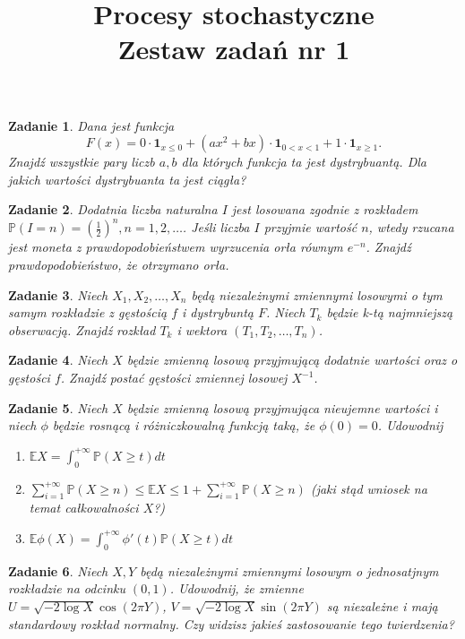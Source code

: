 \documentclass{mwart}
\title{Procesy stochastyczne\\ Zestaw zadań nr 1}
\newtheorem{zd}{Zadanie}
\begin{document}

\maketitle
\begin{zd}
Dana jest funkcja
\begin{displaymath}
F(x) = 0\cdot\pmb{1}_{x\leq 0} + (ax^2+bx)\cdot\pmb{1}_{0<x< 1} + 1\cdot \pmb{1}_{x\geq 1}.
\end{displaymath}
Znajdź wszystkie pary liczb $a, b$ dla których funkcja ta jest dystrybuantą. Dla jakich wartości dystrybuanta ta jest ciągła?
\end{zd}

\begin{zd}
Dodatnia liczba naturalna $I$ jest losowana zgodnie z rozkładem $\mathbb{P}(I =n) = \left(\frac{1}{2}\right)^n, n = 1,2, \dots$. Jeśli liczba $I$ przyjmie wartość $n$, wtedy rzucana jest moneta z prawdopodobieństwem wyrzucenia orła równym $e^{-n}$. Znajdź prawdopodobieństwo, że otrzymano orła.
\end{zd}

\begin{zd}
Niech $X_1, X_2, \dots, X_n$ będą niezależnymi zmiennymi losowymi o tym samym rozkładzie z gęstością $f$ i dystrybuntą $F$. Niech $T_k$ będzie k-tą najmniejszą obserwacją. Znajdź rozkład $T_k$ i wektora $(T_1, T_2, \dots, T_n)$.
\end{zd}

\begin{zd}
Niech $X$ będzie zmienną losową przyjmującą dodatnie wartości oraz o gęstości $f$. Znajdź postać gęstości zmiennej losowej $X^{-1}$.
\end{zd}
\begin{zd}
Niech $X$ będzie zmienną losową przyjmująca nieujemne wartości i niech $\phi$ będzie rosnącą i różniczkowalną funkcją taką, że $\phi(0) =0$. Udowodnij
\begin{enumerate}
\item $\mathbb{E}X = \int_0^{+\infty}\mathbb{P}(X\geq t)dt$
\item $\sum_{i=1}^{+\infty}\mathbb{P}(X \geq n) \leq \mathbb{E}X \leq 1 +\sum_{i=1}^{+\infty}\mathbb{P}(X \geq n)$ (jaki stąd wniosek na temat całkowalności $X$?)
\item  $\mathbb{E}\phi(X) = \int_0^{+\infty}\phi'(t)\mathbb{P}(X\geq t)dt$
\end{enumerate}
\end{zd}

\begin{zd}
Niech $X, Y$ będą niezależnymi zmiennymi losowym o jednosatjnym rozkładzie na odcinku $(0,1)$. Udowodnij, że zmienne $U = \sqrt{-2\log X}\cos(2\pi Y)$, $V = \sqrt{-2\log X}\sin (2\pi Y)$ są niezależne i mają standardowy rozkład normalny. Czy widzisz jakieś zastosowanie tego twierdzenia?
\end{zd}
\end{document}
